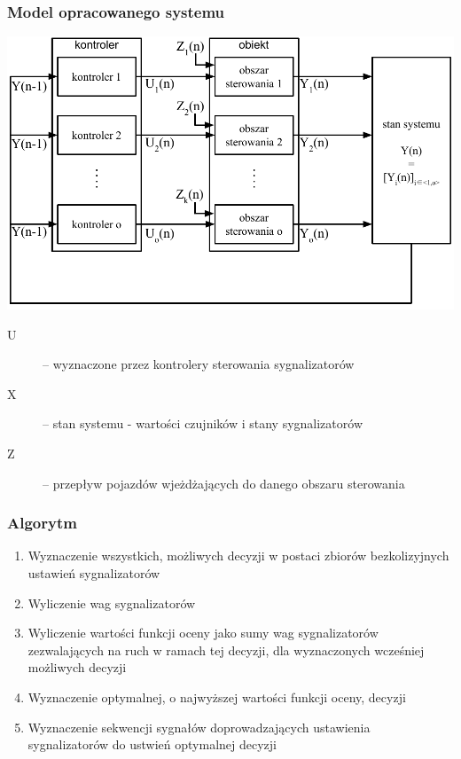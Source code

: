 \documentclass[17pt]{beamer}
\begin{document}
\begin{frame}[shrink=5]
 \frametitle{\vspace{22px}Model opracowanego systemu}
 \includegraphics[width=1.0\textwidth]{model.pdf}
  \tiny{
  \begin{description}
   \item[U] -- wyznaczone przez kontrolery sterowania sygnalizatorów\\
   \item[X] -- stan systemu - wartości czujników i stany sygnalizatorów\\
   \item[Z] -- przepływ pojazdów wjeżdżających do danego obszaru sterowania\\
  \end{description}
   }
\end{frame}

\begin{frame}%
  \scriptsize {
  \frametitle{\vspace{22px}Algorytm}
  \begin{enumerate}
    \item Wyznaczenie wszystkich, możliwych decyzji w postaci zbiorów bezkolizyjnych ustawień sygnalizatorów
    \item Wyliczenie wag sygnalizatorów
    \item Wyliczenie wartości funkcji oceny jako sumy wag sygnalizatorów zezwalających na ruch w ramach tej decyzji, dla wyznaczonych wcześniej możliwych decyzji
    \item Wyznaczenie optymalnej, o najwyższej wartości funkcji oceny, decyzji
    \item Wyznaczenie sekwencji sygnałów doprowadzających ustawienia sygnalizatorów do ustwień optymalnej decyzji
  \end{enumerate}
  }
\end{frame}
\end{document}
